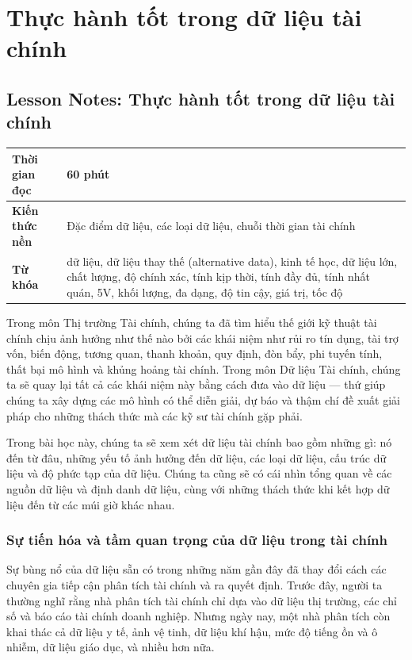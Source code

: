 \chapter{Thực hành tốt trong dữ liệu tài chính}
\label{ch:M1L1}

\section{Lesson Notes: Thực hành tốt trong dữ liệu tài chính}
\label{sec:M1L1-lessonnotes}

\begin{center}
\begin{tabular}{|l|p{10cm}|}
\hline
\textbf{Thời gian đọc} & 60 phút \\
\hline
\textbf{Kiến thức nền} & Đặc điểm dữ liệu, các loại dữ liệu, chuỗi thời gian tài chính \\
\hline
\textbf{Từ khóa} & dữ liệu, dữ liệu thay thế (alternative data), kinh tế học, dữ liệu lớn, chất lượng, độ chính xác, tính kịp thời, tính đầy đủ, tính nhất quán, 5V, khối lượng, đa dạng, độ tin cậy, giá trị, tốc độ \\
\hline
\end{tabular}
\end{center}

Trong môn Thị trường Tài chính, chúng ta đã tìm hiểu thế giới kỹ thuật tài chính chịu ảnh hưởng như thế nào bởi các khái niệm như rủi ro tín dụng, tài trợ vốn, biến động, tương quan, thanh khoản, quy định, đòn bẩy, phi tuyến tính, thất bại mô hình và khủng hoảng tài chính. Trong môn Dữ liệu Tài chính, chúng ta sẽ quay lại tất cả các khái niệm này bằng cách đưa vào dữ liệu — thứ giúp chúng ta xây dựng các mô hình có thể diễn giải, dự báo và thậm chí đề xuất giải pháp cho những thách thức mà các kỹ sư tài chính gặp phải.

Trong bài học này, chúng ta sẽ xem xét dữ liệu tài chính bao gồm những gì: nó đến từ đâu, những yếu tố ảnh hưởng đến dữ liệu, các loại dữ liệu, cấu trúc dữ liệu và độ phức tạp của dữ liệu. Chúng ta cũng sẽ có cái nhìn tổng quan về các nguồn dữ liệu và định danh dữ liệu, cùng với những thách thức khi kết hợp dữ liệu đến từ các múi giờ khác nhau.

\subsection{Sự tiến hóa và tầm quan trọng của dữ liệu trong tài chính}

Sự bùng nổ của dữ liệu sẵn có trong những năm gần đây đã thay đổi cách các chuyên gia tiếp cận phân tích tài chính và ra quyết định. Trước đây, người ta thường nghĩ rằng nhà phân tích tài chính chỉ dựa vào dữ liệu thị trường, các chỉ số và báo cáo tài chính doanh nghiệp. Nhưng ngày nay, một nhà phân tích còn khai thác cả dữ liệu y tế, ảnh vệ tinh, dữ liệu khí hậu, mức độ tiếng ồn và ô nhiễm, dữ liệu giáo dục, và nhiều hơn nữa.

